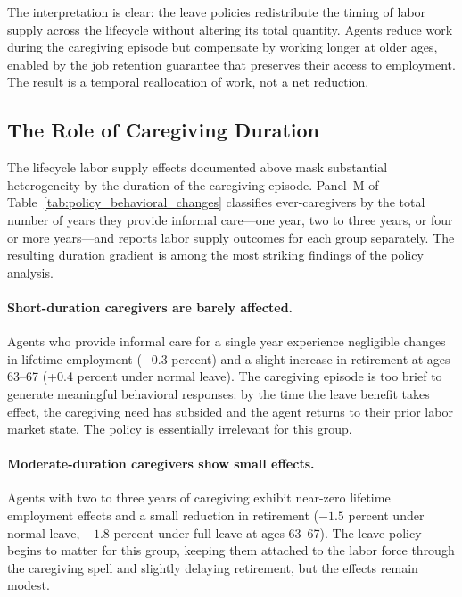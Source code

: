 The interpretation is clear: the leave policies redistribute the timing of labor supply across the lifecycle without altering its total quantity. Agents reduce work during the caregiving episode but compensate by working longer at older ages, enabled by the job retention guarantee that preserves their access to employment. The result is a temporal reallocation of work, not a net reduction.


\subsection{The Role of Caregiving Duration}\label{subsec:duration}

The lifecycle labor supply effects documented above mask substantial heterogeneity by the duration of the caregiving episode. Panel~M of Table~\ref{tab:policy_behavioral_changes} classifies ever-caregivers by the total number of years they provide informal care---one year, two to three years, or four or more years---and reports labor supply outcomes for each group separately. The resulting duration gradient is among the most striking findings of the policy analysis.

\paragraph{Short-duration caregivers are barely affected.} Agents who provide informal care for a single year experience negligible changes in lifetime employment ($-0.3$ percent) and a slight increase in retirement at ages 63--67 (+0.4 percent under normal leave). The caregiving episode is too brief to generate meaningful behavioral responses: by the time the leave benefit takes effect, the caregiving need has subsided and the agent returns to their prior labor market state. The policy is essentially irrelevant for this group.

\paragraph{Moderate-duration caregivers show small effects.} Agents with two to three years of caregiving exhibit near-zero lifetime employment effects and a small reduction in retirement ($-1.5$ percent under normal leave, $-1.8$ percent under full leave at ages 63--67). The leave policy begins to matter for this group, keeping them attached to the labor force through the caregiving spell and slightly delaying retirement, but the effects remain modest.

